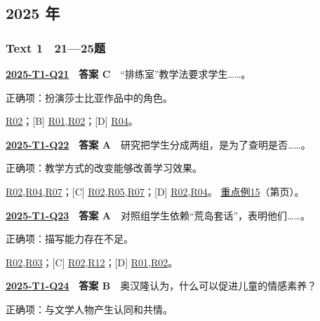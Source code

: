 \documentclass[11pt,a4paper]{article}
\begin{document}
\subsection{2025 年}\label{year-2025}
\subsubsection{Text 1　21—25题}
\label{idx-2025-T1-Q21}
\noindent\textbf{\href{https://zj139.github.io/math-notes/english/cabb22521ad878901633c3a3/\#q21}{2025-T1-Q21}　答案 C}　“排练室”教学法要求学生……。\par\nopagebreak
\noindent 正确项：扮演莎士比亚作品中的角色。\par\nopagebreak
\noindent [A] \hyperref[cat-R02]{R02}；[B] \hyperref[cat-R01]{R01},\hyperref[cat-R02]{R02}；[D] \hyperref[cat-R04]{R04}。
\par\smallskip
{}\label{idx-2025-T1-Q22}
\noindent\textbf{\href{https://zj139.github.io/math-notes/english/cabb22521ad878901633c3a3/\#q22}{2025-T1-Q22}　答案 A}　研究把学生分成两组，是为了查明是否……。\par\nopagebreak
\noindent 正确项：教学方式的改变能够改善学习效果。\par\nopagebreak
\noindent [B] \hyperref[cat-R02]{R02},\hyperref[cat-R04]{R04},\hyperref[cat-R07]{R07}；[C] \hyperref[cat-R02]{R02},\hyperref[cat-R05]{R05},\hyperref[cat-R07]{R07}；[D] \hyperref[cat-R02]{R02},\hyperref[cat-R04]{R04}。
\hyperref[case-2025-T1-Q22]{重点例15}（第\pageref{case-2025-T1-Q22}页）。
\par\smallskip
{}\label{idx-2025-T1-Q23}
\noindent\textbf{\href{https://zj139.github.io/math-notes/english/cabb22521ad878901633c3a3/\#q23}{2025-T1-Q23}　答案 A}　对照组学生依赖“荒岛套话”，表明他们……。\par\nopagebreak
\noindent 正确项：描写能力存在不足。\par\nopagebreak
\noindent [B] \hyperref[cat-R02]{R02},\hyperref[cat-R03]{R03}；[C] \hyperref[cat-R02]{R02},\hyperref[cat-R12]{R12}；[D] \hyperref[cat-R01]{R01},\hyperref[cat-R02]{R02}。
\par\smallskip
{}\label{idx-2025-T1-Q24}
\noindent\textbf{\href{https://zj139.github.io/math-notes/english/cabb22521ad878901633c3a3/\#q24}{2025-T1-Q24}　答案 B}　奥汉隆认为，什么可以促进儿童的情感素养？\par\nopagebreak
\noindent 正确项：与文学人物产生认同和共情。\par\nopagebreak
\end{document}
